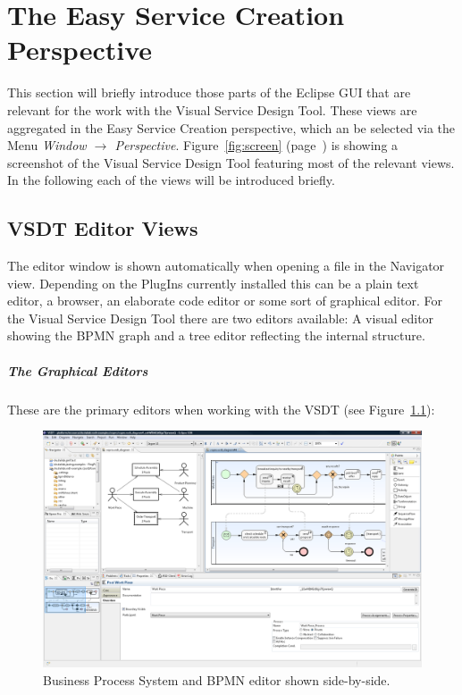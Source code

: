 \chapter{The Easy Service Creation Perspective}
\label{sec:user_perspective}

This section will briefly introduce those parts of the Eclipse GUI that are relevant for the work with the Visual Service Design Tool.  These views are aggregated in the Easy Service Creation perspective, which an be selected via the Menu \emph{Window $\rightarrow$ Perspective}.  Figure~\ref{fig:screen} (page~\pageref{fig:screen}) is showing a screenshot of the Visual Service Design Tool featuring most of the relevant views.  In the following each of the views will be introduced briefly.


\section{VSDT Editor Views}
\label{sec:user_perspective_editor}

The editor window is shown automatically when opening a file in the Navigator view. Depending on the PlugIns currently installed this can be a plain text editor, a browser, an elaborate code editor or some sort of graphical editor. For the Visual Service Design Tool there are two editors available: A visual editor showing the BPMN graph and a tree editor reflecting the internal structure.  

\paragraph*{The Graphical Editors}
These are the primary editors when working with the VSDT (see Figure~\ref{fig:screen_meta}):

\begin{figure}
	\centering
	\includegraphics[height=.4\textheight]{figures/vsdt_1-2-0.png}
	\caption{Business Process System and BPMN editor shown side-by-side.}
	\label{fig:screen_meta}
\end{figure}

